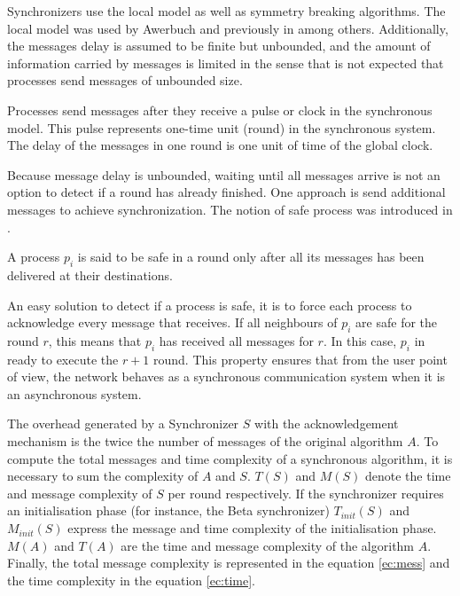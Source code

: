 Synchronizers use the local model as well as symmetry breaking algorithms. The local model was used by Awerbuch \cite{awerbuch1985complexity} and previously in \cite{segall1983distributed,gallager1982distributed} among others. Additionally, the messages delay is assumed to be finite but unbounded, and the amount of information carried by messages is limited in the sense that is not expected that processes send messages of unbounded size.

Processes send messages after they receive a pulse or clock in the synchronous model. This pulse represents one-time unit (round) in the synchronous system. The delay of the messages in one round is one unit of time of the global clock.

Because message delay is unbounded, waiting until all messages arrive is not an option to detect if a round has already finished. One approach is send additional messages to achieve synchronization. The notion of safe process was introduced in \cite{awerbuch1985complexity}.



\begin{definition}
\label{def:safe}
A process $p_i$ is said to be safe in a round only after all its messages has been delivered at their destinations.
\end{definition}

An easy solution to detect if a process is safe, it is to force each process to acknowledge every message that receives. If all neighbours of $p_i$ are safe for the round $r$, this means that $p_i$ has received all messages for $r$. In this case, $p_i$ in ready to execute the $r + 1$ round. This property ensures that from the user point of view, the network behaves as a synchronous communication system when it is an asynchronous system. 

The overhead generated by a Synchronizer $S$ with the acknowledgement mechanism is the twice the number of messages of the original algorithm $A$. To compute the total messages and time complexity of a synchronous algorithm, it is necessary to sum the complexity of $A$ and $S$. $T(S)$ and $M(S)$ denote the time and message complexity of $S$ per round respectively. If the synchronizer requires an initialisation phase (for instance, the Beta synchronizer) $T_{init}(S)$ and $M_{init}(S)$ express the message and time complexity of the initialisation phase.  $M(A)$ and $T(A)$ are the time and message complexity of the algorithm $A$. Finally, the total message complexity is represented in the equation \ref{ec:mess} and the time complexity in the equation \ref{ec:time}. 


